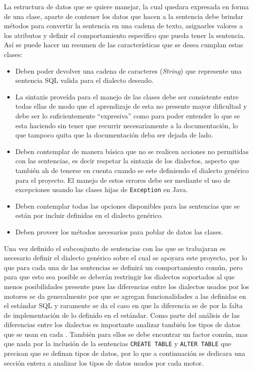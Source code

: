La estructura de datos que se quiere manejar, la cual quedara expresada en forma de una clase, aparte de contener los datos que hacen a la sentencia debe brindar métodos para convertir la sentencia en una cadena de texto, asignarles valores a los atributos y definir el comportamiento especifico que pueda tener la sentencia. Así se puede hacer un resumen de las características que se desea cumplan estas clases:
\begin{itemize}
%
	\item Deben poder devolver una cadena de caracteres (\textit{String}) que represente una sentencia SQL valida para el dialecto deseado.
	\item La sintaxis proveída para el manejo de las clases debe ser consistente entre todas ellas de modo que el aprendizaje de esta no presente mayor dificultad y debe ser lo suficientemente ``expresiva'' como para poder entender lo que se esta haciendo sin tener que recurrir necesariamente a la documentación, lo que tampoco quita que la documentación deba ser dejada de lado. 
	\item Deben contemplar de manera básica que no se realicen acciones no permitidas con las sentencias, es decir respetar la sintaxis de los dialectos, aspecto que también ah de tenerse en cuenta cuando se este definiendo el dialecto genérico para el proyecto. El manejo de estos errores debe ser mediante el uso de excepciones usando las clases hijas de \verb=Exception= en Java.
	\item Deben contemplar todas las opciones disponibles para las sentencias que se están por incluir definidas en el dialecto genérico.
	\item Deben proveer los métodos necesarios para poblar de datos las clases.
%
\end{itemize}
%
Una vez definido el subconjunto de sentencias con las que se trabajaran es necesario definir el dialecto genérico sobre el cual se apoyara este proyecto, por lo que para cada una de las sentencias se definirá un comportamiento común, pero para que esto sea posible se deberán restringir los dialectos soportados al que menos posibilidades presente pues las diferencias entre los dialectos usados por los motores se da generalmente por que se agregan funcionalidades a las definidas en el estándar  SQL y raramente se da el caso en que la diferencia se de por la falta de implementación de lo definido en el estándar. Como parte del análisis de las diferencias entre los dialectos es importante analizar también los tipos de datos que se usan en cada \dd. También para ellos se debe encontrar un factor común, mas que nada por la inclusión de la sentencias \verb=CREATE TABLE= y \verb=ALTER TABLE= que precisan que se definan tipos de datos, por lo que a continuación se dedicara una sección entera a analizar los tipos de datos usados por cada motor.
%
%
